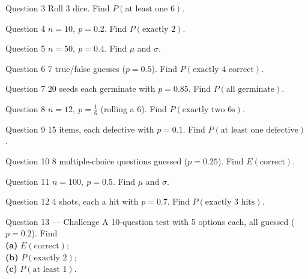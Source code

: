 \documentclass[11pt]{article}
\begin{document}
\begin{qbox}{Question 3}
Roll 3 dice. Find $P(\text{at least one 6})$.\workspace{2.4cm}
\end{qbox}

\begin{qbox}{Question 4}
$n=10,\ p=0.2$. Find $P(\text{exactly 2})$.\workspace{2.4cm}
\end{qbox}

\begin{qbox}{Question 5}
$n=50,\ p=0.4$. Find $\mu$ and $\sigma$.\workspace{2.4cm}
\end{qbox}

\begin{qbox}{Question 6}
7 true/false guesses ($p=0.5$). Find $P(\text{exactly 4 correct})$.\workspace{2.4cm}
\end{qbox}

\begin{qbox}{Question 7}
20 seeds each germinate with $p=0.85$. Find $P(\text{all germinate})$.\workspace{2.4cm}
\end{qbox}

\begin{qbox}{Question 8}
$n=12,\ p=\tfrac16$ (rolling a 6). Find $P(\text{exactly two 6s})$.\workspace{2.4cm}
\end{qbox}

\begin{qbox}{Question 9}
15 items, each defective with $p=0.1$. Find $P(\text{at least one defective})$.\workspace{2.4cm}
\end{qbox}

\begin{qbox}{Question 10}
8 multiple-choice questions guessed ($p=0.25$). Find $E(\text{correct})$.\workspace{2.4cm}
\end{qbox}

\begin{qbox}{Question 11}
$n=100,\ p=0.5$. Find $\mu$ and $\sigma$.\workspace{2.4cm}
\end{qbox}

\begin{qbox}{Question 12}
4 shots, each a hit with $p=0.7$. Find $P(\text{exactly 3 hits})$.\workspace{2.4cm}
\end{qbox}

\begin{qbox}{Question 13 --- Challenge}
A 10-question test with 5 options each, all guessed ($p=0.2$). Find \\ \textbf{(a)} $E(\text{correct})$; \\ \textbf{(b)} $P(\text{exactly 2})$; \\ \textbf{(c)} $P(\text{at least 1})$.\workspace{3.4cm}
\end{qbox}
\end{document}
